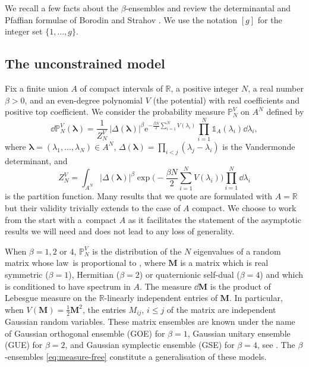 \documentclass[10pt,a4paper]{amsart}
\numberwithin{equation}{section}
\newcommand{\ee}{\mathrm{e}}
\newcommand{\ind}{\mathds{1}}
\begin{document}
We recall a few facts about the $\beta$-ensembles and review the
determinantal and Pfaffian formulae of Borodin and Strahov \cite{borodin_averages}. We use the notation $[g]$ for the integer set $\{1,\ldots,g\}$.

\subsection{The unconstrained model}%

Fix a finite union $A$ of compact intervals of $\mathbb{R}$, a positive integer $N$, a real number
$\beta > 0$, and an even-degree polynomial $V$ (the potential) with real coefficients and positive top coefficient. We consider the probability measure
$\mathbb{P}_{N}^{V}$ on $A^{N}$ defined by
\begin{equation}\label{eq:measure-free}
 \dd \mathbb{P}_{N}^V(\bm{\lambda}) = \frac{1}{Z_{N}^V}\,|\Delta(\bm{\lambda})|^{\beta}\ee^{-\frac{\beta N}{2}\sum_{i = 1}^N V(\lambda_{i})}\prod_{i=1}^{N}\ind_{A}(\lambda_{i})\dd\lambda_{i},
\end{equation}
where
$\bm{\lambda} = (\lambda_{1}, \ldots, \lambda_{N}) \in A^{N}$,
$\Delta(\bm{\lambda}) = \prod_{i < j}(\lambda_{j} - \lambda_{i})$ is
the Vandermonde determinant, and
\begin{equation*}
 Z_{N}^V = \int_{A^{N}} |\Delta(\bm{\lambda})|^{\beta}\exp\Biggl(-\frac{\beta N}{2}\sum_{i = 1}^N V(\lambda_{i})\Biggr) \prod_{i=1}^{N}\dd\lambda_{i}
\end{equation*}
is the partition function. Many results that we quote are formulated with $A = \mathbb{R}$ but their validity trivially extends to the case of $A$ compact. We choose to work from the start with a~compact $A$ as it facilitates the statement of the asymptotic results we will need and does not lead to any loss of generality.

 When $\beta = 1, 2 \text{ or }4$,
 $\mathbb{P}_{N}^{V}$ is the distribution of the $N$ eigenvalues of
 a random matrix whose law~is proportional to ,
  where $\bm{M}$ is a matrix which is real symmetric ($\beta = 1$), Hermitian ($\beta = 2$) or
 quaternionic self-dual ($\beta = 4$) and which is conditioned to have spectrum in $A$. The measure $\dd \bm{M}$ is
 the product of Lebesgue measure on the $\mathbb{R}$-linearly independent entries of $\bm{M}$. In particular, when $V(\bm{M}) = \frac{1}{2}\bm{M}^2$, the entries $M_{ij}$, $i \leq j$
 of the matrix are independent Gaussian random variables. These matrix ensembles
are known under the name of Gaussian orthogonal ensemble
 (GOE) for $\beta = 1$, Gaussian unitary ensemble (GUE) for
 $\beta = 2$, and Gaussian symplectic ensemble (GSE) for $\beta = 4$,
 see \cite{Mehtabook}. The $\beta$-ensembles \eqref{eq:measure-free} constitute a
 generalisation of these models.
\end{document}
